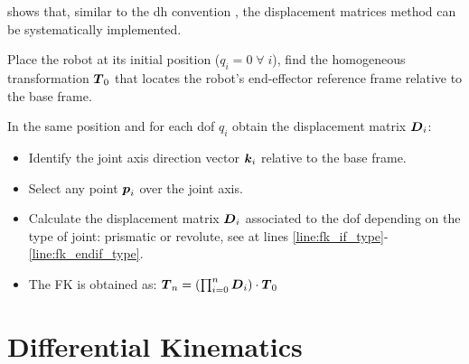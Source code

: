  shows that, similar to the \ac{dh} convention \cite{Denavit1955}, the displacement matrices method can be systematically implemented.

Place the robot at its initial position ($q_i=0\;\forall{}\;i$), find the homogeneous transformation $\boldsymbol{T}_0$ that locates the robot's end-effector reference frame relative to the base frame.

In the same position and for each \ac{dof} $q_i$ obtain the displacement matrix $\boldsymbol{D}_i$:
\begin{itemize}
\item Identify the joint axis direction vector $\boldsymbol{k}_i$ relative to the base frame.
\item Select any point $\boldsymbol{p}_i$ over the joint axis.
\item Calculate the displacement matrix $\boldsymbol{D}_i$ associated to the \ac{dof} depending on the type of joint: prismatic or revolute, see  at lines \ref{line:fk_if_type}-\ref{line:fk_endif_type}.
\item The FK is obtained as: $\boldsymbol{T}_n=\left(\prod_{i=0}^n\boldsymbol{D}_i\right)\cdot\boldsymbol{T}_0$
\end{itemize}

\section{Differential Kinematics}

